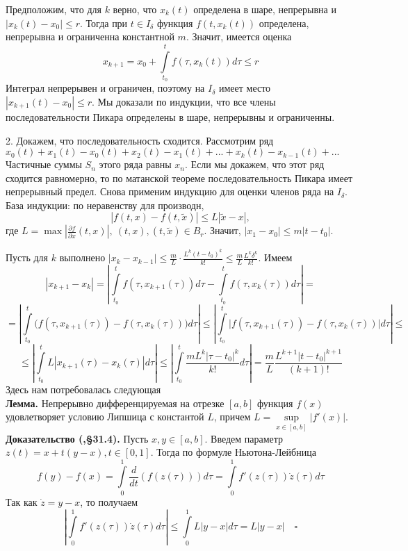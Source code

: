 Предположим, что для $k$ верно, что $x_k(t)$ определена в шаре, непрерывна и
$|x_k(t)-x_0|\leqslant r$. Тогда при $t\in I_\delta$ функция
$f(t,x_k(t))$ определена, непрерывна и ограниченна константной  $m$. Значит,
имеется оценка
$$x_{k+1}=x_0+
 \int\limits_{t_0}^{t}f(\tau,x_k(t))d\tau\leqslant  r$$
Интеграл непрерывен и ограничен, поэтому на $I_\delta$ имеет место
$|x_{k+1}(t)-x_0|\leqslant r$. Мы доказали по индукции, что все члены 
последовательности Пикара определены в шаре, непрерывны и ограниченны.

2. Докажем, что последовательность сходится. Рассмотрим ряд 
$x_0(t)+x_1(t)-x_0(t)+x_2(t)-x_1(t)+...+x_k(t)-x_{k-1}(t)+...$
Частичные суммы $S_n$ этого ряда равны $x_n$. Если мы докажем, что этот
ряд сходится равномерно, то по матанской теореме последовательность Пикара 
имеет непрерывный предел. Снова применим индукцию для оценки членов ряда
на $I_\delta$. База индукции: по неравенству для производн, 
$$|f(t,x)-f(t,\tilde x)|\leqslant L|\tilde x-x|,$$
где $L=\max\left|\frac{\partial f}{\partial x}(t,x)\right|,~(t,x),
(t,\tilde x)\in B_r$. Значит, $|x_1-x_0|\leqslant m|t-t_0|$. 

Пусть для $k$ выполнено  $|x_{k}-x_{k-1}|\leqslant \frac{m}{L}\cdot 
\frac{L^k(t-t_0)^k}{k!}\leqslant \frac{m}{L}\frac{L^k\delta^k}{k!}$.
Имеем 
$$|x_{k+1}-x_k|= \left|\int\limits_{t_0}^{t}f(\tau,x_{k+1}(\tau))d\tau-
\int\limits_{t_0}^{t}f(\tau,x_{k}(\tau))d\tau\right| = $$
$$=
\left|\int\limits_{t_0}^{t}\big(f(\tau,x_{k+1}(\tau))-f(\tau,x_{k}(\tau))\big)
d\tau\right|\leqslant
 \left|\int\limits_{t_0}^{t}\big|f(\tau,x_{k+1}(\tau))-
f(\tau,x_{k}(\tau))\big|d\tau\right|\leqslant
$$
$$\leqslant 
\left| \int\limits_{t_0}^{t}L|x_{k+1}(\tau)-x_k(\tau)|d\tau\right|
\leqslant 
\left| \int\limits_{t_0}^{t}\frac{mL^{k}|\tau-t_0|^{k}}{k!}d\tau\right|
= \frac{m}{L}\frac{L^{k+1}|t-t_0|^{k+1}}{(k+1)!}
$$
Здесь нам потребовалась следующая\\
\textbf{Лемма.} Непрерывно дифференцируемая на отрезке $[a,b]$ функция $f(x)$  
удовлетворяет условию Липшица с константой $L$, причем  
$L=\sup\limits_{x\in [a,b]}|f'(x)|$.\\
\textbf{Доказательство (\cite{Arnold},\S31.4).} Пусть $x,y\in [a,b]$. 
Введем параметр $z(t)=x+t(y-x),t\in [0,1]$. Тогда по формуле 
Ньютона-Лейбница
$$f(y)-f(x)=\int\limits_{0}^{1}\frac{d}{dt}(f(z(\tau)))d\tau=
\int\limits_{0}^{1}f'(z(\tau))\dot z(\tau)d\tau$$ 
Так как $\dot z = y - x$, то получаем
$$\left| \int\limits_{0}^{1}f'(z(\tau))\dot z(\tau)d\tau\right|\leqslant 
\int\limits_{0}^{1}L|y-x|d\tau = L|y-x| \quad\square $$

